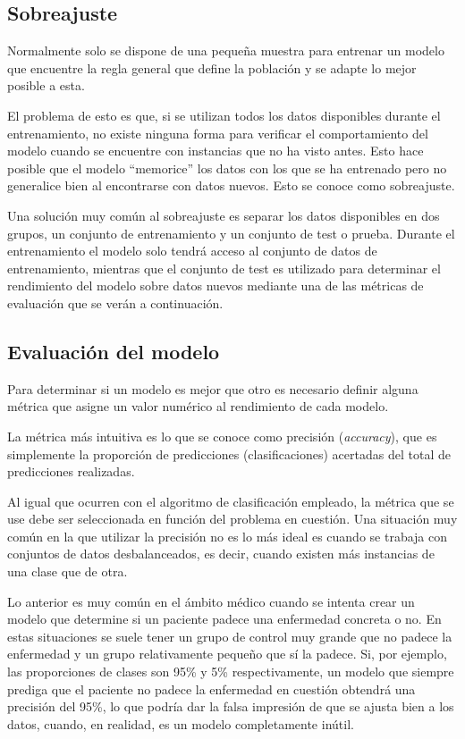 \subsection{Sobreajuste}

Normalmente solo se dispone de una pequeña muestra para entrenar un modelo que
encuentre la regla general que define la población y se adapte lo mejor posible
a esta.

El problema de esto es que, si se utilizan todos los datos disponibles durante
el entrenamiento, no existe ninguna forma para verificar el comportamiento del
modelo cuando se encuentre con instancias que no ha visto antes. Esto hace
posible que el modelo ``memorice'' los datos con los que se ha entrenado pero no
generalice bien al encontrarse con datos nuevos. Esto se conoce como
sobreajuste.


Una solución muy común al sobreajuste es separar los datos disponibles en dos
grupos, un conjunto de entrenamiento y un conjunto de test o prueba. Durante el
entrenamiento el modelo solo tendrá acceso al conjunto de datos de
entrenamiento, mientras que el conjunto de test es utilizado para determinar el
rendimiento del modelo sobre datos nuevos mediante una de las métricas de
evaluación que se verán a continuación.

\subsection{Evaluación del modelo}

Para determinar si un modelo es mejor que otro es necesario definir alguna
métrica que asigne un valor numérico al rendimiento de cada modelo.

La métrica más intuitiva es lo que se conoce como precisión (\textit{accuracy}),
que es simplemente la proporción de predicciones (clasificaciones) acertadas del
total de predicciones realizadas.

Al igual que ocurren con el algoritmo de clasificación empleado, la métrica que
se use debe ser seleccionada en función del problema en cuestión. Una situación
muy común en la que utilizar la precisión no es lo más ideal es cuando se
trabaja con conjuntos de datos desbalanceados, es decir, cuando existen más
instancias de una clase que de otra.

Lo anterior es muy común en el ámbito médico cuando se intenta crear un modelo
que determine si un paciente padece una enfermedad concreta o no. En estas
situaciones se suele tener un grupo de control muy grande que no padece la
enfermedad y un grupo relativamente pequeño que sí la padece. Si, por ejemplo,
las proporciones de clases son 95\% y 5\% respectivamente, un modelo que siempre
prediga que el paciente no padece la enfermedad en cuestión obtendrá una
precisión del 95\%, lo que podría dar la falsa impresión de que se ajusta bien a
los datos, cuando, en realidad, es un modelo completamente inútil.

